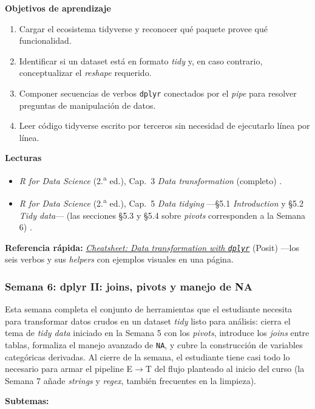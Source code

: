 \documentclass[11pt,letterpaper]{article}
\newcommand{\semana}[2]{%
  \subsubsection*{\color{main}Semana #1: #2}%
}
\newcommand{\cheatsheet}[2]{%
  \href{https://rstudio.github.io/cheatsheets/#1.pdf}{\textit{Cheatsheet: #2}}%
}
\begin{document}
\medskip
\noindent\textbf{Objetivos de aprendizaje}
\begin{enumerate}[leftmargin=*, itemsep=1pt]
    \item Cargar el ecosistema tidyverse y reconocer qué paquete provee qué funcionalidad.
    \item Identificar si un dataset está en formato \textit{tidy} y, en caso contrario, conceptualizar el \textit{reshape} requerido.
    \item Componer secuencias de verbos \texttt{dplyr} conectados por el \textit{pipe} para resolver preguntas de manipulación de datos.
    \item Leer código tidyverse escrito por terceros sin necesidad de ejecutarlo línea por línea.
\end{enumerate}

\medskip
\noindent\textbf{Lecturas}
\begin{itemize}[leftmargin=*, itemsep=1pt]
    \item \textit{R for Data Science} (2.\textsuperscript{a} ed.), Cap.\ 3 \textit{Data transformation} (completo) \cite{wickham2023r4ds}.
    \item \textit{R for Data Science} (2.\textsuperscript{a} ed.), Cap.\ 5 \textit{Data tidying} ---§5.1 \textit{Introduction} y §5.2 \textit{Tidy data}--- (las secciones §5.3 y §5.4 sobre \textit{pivots} corresponden a la Semana 6) \cite{wickham2023r4ds}.
\end{itemize}

\medskip
\noindent\textbf{Referencia rápida:} \cheatsheet{data-transformation}{Data transformation with \texttt{dplyr}} (Posit) ---los seis verbos y sus \textit{helpers} con ejemplos visuales en una página.

\semana{6}{dplyr II: joins, pivots y manejo de NA}

Esta semana completa el conjunto de herramientas que el estudiante necesita para transformar datos crudos en un dataset \textit{tidy} listo para análisis: cierra el tema de \textit{tidy data} iniciado en la Semana 5 con los \textit{pivots}, introduce los \textit{joins} entre tablas, formaliza el manejo avanzado de \texttt{NA}, y cubre la construcción de variables categóricas derivadas. Al cierre de la semana, el estudiante tiene casi todo lo necesario para armar el pipeline E$\to$T del flujo planteado al inicio del curso (la Semana 7 añade \textit{strings} y \textit{regex}, también frecuentes en la limpieza).

\textbf{Subtemas:}
\end{document}
